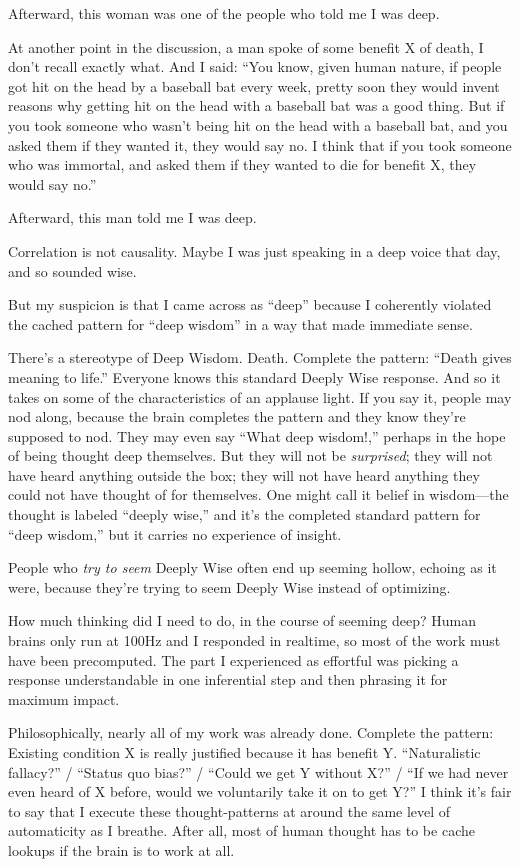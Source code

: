 {
 Afterward, this woman was one of the people who told me I was
deep.}

{
 At another point in the discussion, a man spoke of some benefit X
of death, I don't recall exactly what. And I said:
``You know, given human nature, if people got hit on
the head by a baseball bat every week, pretty soon they would invent
reasons why getting hit on the head with a baseball bat was a good
thing. But if you took someone who wasn't being hit on
the head with a baseball bat, and you asked them if they wanted it,
they would say no. I think that if you took someone who was immortal,
and asked them if they wanted to die for benefit X, they would say
no.''}

{
 Afterward, this man told me I was deep.}

{
 Correlation is not causality. Maybe I was just speaking in a deep
voice that day, and so sounded wise.}

{
 But my suspicion is that I came across as
``deep'' because I coherently
violated the cached pattern for ``deep
wisdom'' in a way that made immediate sense.}

{
 There's a stereotype of Deep Wisdom. Death.
Complete the pattern: ``Death gives meaning to
life.'' Everyone knows this standard Deeply Wise
response. And so it takes on some of the characteristics of an applause
light. If you say it, people may nod along, because the brain completes
the pattern and they know they're supposed to nod. They
may even say ``What deep wisdom!,''
perhaps in the hope of being thought deep themselves. But they will not
be \textit{surprised}; they will not have heard anything outside the
box; they will not have heard anything they could not have thought of
for themselves. One might call it belief in wisdom---the thought is
labeled ``deeply wise,'' and
it's the completed standard pattern for
``deep wisdom,'' but it carries no
experience of insight.}

{
 People who \textit{try to seem} Deeply Wise often end up seeming
hollow, echoing as it were, because they're trying to
seem Deeply Wise instead of optimizing.}

{
 How much thinking did I need to do, in the course of seeming deep?
Human brains only run at 100Hz and I responded in realtime, so most of
the work must have been precomputed. The part I experienced as
effortful was picking a response understandable in one inferential step
and then phrasing it for maximum impact.}

{
 Philosophically, nearly all of my work was already done. Complete
the pattern: Existing condition X is really justified because it has
benefit Y. ``Naturalistic fallacy?''
/ ``Status quo bias?'' /
``Could we get Y without X?'' /
``If we had never even heard of X before, would we
voluntarily take it on to get Y?'' I think
it's fair to say that I execute these thought-patterns
at around the same level of automaticity as I breathe. After all, most
of human thought has to be cache lookups if the brain is to work at
all.}

